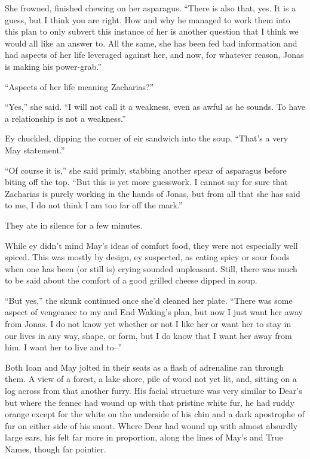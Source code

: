 She frowned, finished chewing on her asparagus. ``There is also that, yes. It is a guess, but I think you are right. How and why he managed to work them into this plan to only subvert this instance of her is another question that I think we would all like an answer to. All the same, she has been fed bad information and had aspects of her life leveraged against her, and now, for whatever reason, Jonas is making his power-grab.''

``Aspects of her life meaning Zacharias?''

``Yes,'' she said. ``I will not call it a weakness, even as awful as he sounds. To have a relationship is not a weakness.''

Ey chuckled, dipping the corner of eir sandwich into the soup. ``That's a very May statement.''

``Of course it is,'' she said primly, stabbing another spear of asparagus before biting off the top. ``But this is yet more guesswork. I cannot say for sure that Zacharias is purely working in the hands of Jonas, but from all that she has said to me, I do not think I am too far off the mark.''

They ate in silence for a few minutes.

While ey didn't mind May's ideas of comfort food, they were not especially well spiced. This was mostly by design, ey suspected, as eating spicy or sour foods when one has been (or still is) crying sounded unpleasant. Still, there was much to be said about the comfort of a good grilled cheese dipped in soup.

``But yes,'' the skunk continued once she'd cleaned her plate. ``There was some aspect of vengeance to my and End Waking's plan, but now I just want her away from Jonas. I do not know yet whether or not I like her or want her to stay in our lives in any way, shape, or form, but I do know that I want her away from him. I want her to live and to--''

Both Ioan and May jolted in their seats as a flash of adrenaline ran through them. A view of a forest, a lake shore, pile of wood not yet lit, and, sitting on a log across from that another furry. His facial structure was very similar to Dear's but where the fennec had wound up with that pristine white fur, he had ruddy orange except for the white on the underside of his chin and a dark apostrophe of fur on either side of his snout. Where Dear had wound up with almost absurdly large ears, his felt far more in proportion, along the lines of May's and True Names, though far pointier.

